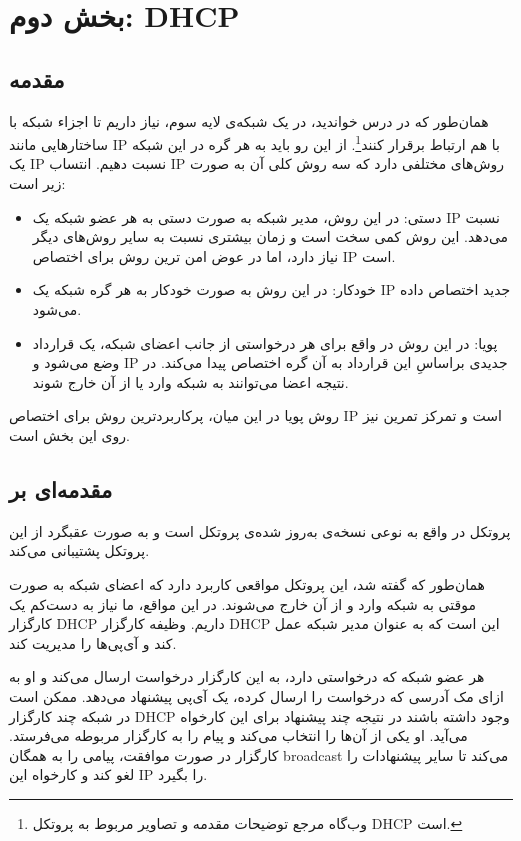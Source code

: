 \newpage
\section{
\textbf{ {\Large 
بخش دوم: DHCP
}}}
\subsection{مقدمه}
همان‌طور که در درس خواندید، در یک شبکه‌ی لایه سوم، نیاز داریم تا اجزاء شبکه با ساختارهایی مانند IP با هم ارتباط برقرار کنند\footnote
{وب‌گاه
مرجع توضیحات مقدمه و تصاویر مربوط به پروتکل DHCP است.
}. از این رو باید به هر گره در این شبکه یک IP نسبت دهیم. انتساب IP روش‌های مختلفی دارد که سه روش کلی آن به صورت زیر است:
\begin{itemize}
\item
دستی: در این روش، مدیر شبکه به صورت دستی به هر عضو شبکه یک IP نسبت می‌دهد. این روش کمی سخت است و زمان بیشتری نسبت به سایر روش‌های دیگر نیاز دارد، اما در عوض امن ترین روش برای اختصاص IP است.

\item
خودکار: در این روش به صورت خودکار به هر گره شبکه یک IP جدید اختصاص داده می‌شود.

\item
پویا: در این روش در واقع برای هر درخواستی از جانب اعضای شبکه، یک قرارداد وضع می‌شود و IP جدیدی براساسِ  این قرارداد به آن گره اختصاص پیدا می‌کند. در نتیجه اعضا می‌توانند به شبکه وارد یا از آن خارج شوند.
\end{itemize}

روش پویا در این میان، پرکاربردترین روش برای اختصاص IP است و تمرکز تمرین نیز روی این بخش است.

\subsection{مقدمه‌ای بر }

پروتکل 
در واقع به نوعی نسخه‌ی به‌روز‌ شده‌ی پروتکل 
است و به صورت عقبگرد از این پروتکل پشتیبانی می‌کند.

همان‌طور که گفته شد، این پروتکل مواقعی کاربرد دارد که اعضای شبکه به صورت موقتی به شبکه وارد و از آن خارج می‌شوند. در این مواقع، ما نیاز به دست‌کم یک کارگزار DHCP داریم. وظیفه کارگزار DHCP این است که به عنوان مدیر شبکه عمل کند و آی‌پی‌ها را مدیریت کند.

  هر عضو شبکه که درخواستی دارد، به این کارگزار درخواست ارسال می‌کند و او به ازای مک آدرسی که درخواست را ارسال کرده،  یک آی‌پی پیشنهاد می‌دهد. ممکن است در شبکه چند کارگزار DHCP وجود داشته باشند در نتیجه چند پیشنهاد برای این کارخواه می‌آید. او یکی از آن‌ها را انتخاب می‌کند و پیام را به کارگزار مربوطه می‌فرستد. کارگزار در صورت موافقت، پیامی را به همگان broadcast می‌کند تا سایر پیشنهادات را لغو کند و کارخواه  این IP را بگیرد.

